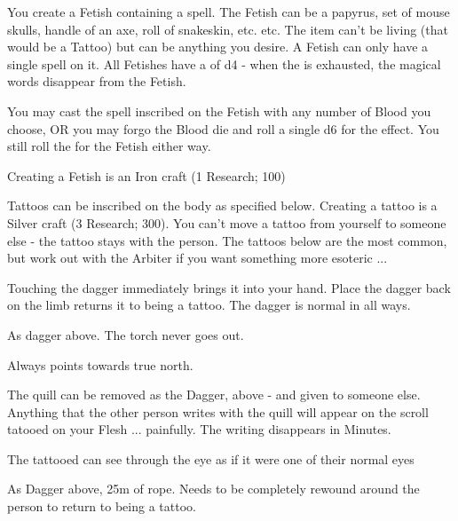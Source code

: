 {You create a Fetish containing a spell.  The Fetish can be a papyrus, set of mouse skulls, handle of an axe, roll of snakeskin, etc. etc.  The item can't be living (that would be a Tattoo) but can be anything you desire.  A Fetish can only have a single spell on it.  All Fetishes have a \UD of d4 - when the \UD is exhausted, the magical words disappear from the Fetish. 

You may cast the spell inscribed on the Fetish with any number of Blood you choose, OR you may forgo the Blood die and roll a single d6 for the effect.  You still roll the \UD for the Fetish either way.

Creating a Fetish is an Iron craft (1 Research; 100\FE)



Tattoos can be inscribed on the body as specified below.  Creating a tattoo is a Silver craft (3 Research; 300\AG).  You can't move a tattoo from yourself to someone else - the tattoo stays with the person.  The tattoos below are the most common, but work out with the Arbiter if you want something more esoteric ...


Touching the dagger immediately brings it into your hand.  Place the dagger back on the limb returns it to being a tattoo.  The dagger is normal in all ways.


As dagger above.  The torch never goes out.


Always points towards true north.  


The quill can be removed as the Dagger, above - and given to someone else.  Anything that the other person writes with the quill will appear on the scroll tatooed on your Flesh ... painfully.  The writing disappears in Minutes.


The tattooed can see through the eye as if it were one of their normal eyes


As Dagger above, 25m of rope. Needs to be completely rewound around the person to return to being a tattoo.


}
